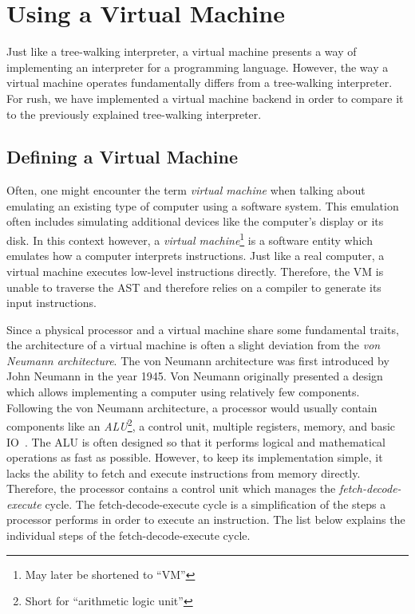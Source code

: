 \section{Using a Virtual Machine}

Just like a tree-walking interpreter, a virtual machine presents a way of implementing an interpreter for a programming language.
However, the way a virtual machine operates fundamentally differs from a tree-walking interpreter.
For rush, we have implemented a virtual machine backend in order to compare it to the previously explained tree-walking interpreter.

\subsection{Defining a Virtual Machine}

Often, one might encounter the term \emph{virtual machine} when talking about emulating an existing type of computer using a software system.
This emulation often includes simulating additional devices like the computer's display or its disk.
In this context however, a \emph{virtual machine}\footnote{May later be shortened to \enquote{VM}} is a software entity which emulates how a computer interprets instructions.
Just like a real computer, a virtual machine executes low-level instructions directly.
Therefore, the VM is unable to traverse the AST and therefore relies on a compiler to generate its input instructions.

Since a physical processor and a virtual machine share some fundamental traits,
the architecture of a virtual machine is often a slight deviation from the \emph{von Neumann architecture}.
The von Neumann architecture was first introduced by John Neumann in the year 1945.
Von Neumann originally presented a design which allows implementing a computer using relatively few components.
Following the von Neumann architecture, a processor would usually contain components like an \emph{ALU}\footnote{Short for \enquote{arithmetic logic unit}}, a control unit, multiple registers, memory, and basic IO~\cite[p.~172]{Ledin2020-yp}.
The ALU is often designed so that it performs logical and mathematical operations as fast as possible.
However, to keep its implementation simple, it lacks the ability to fetch and execute instructions from memory directly.
Therefore, the processor contains a control unit which manages the \emph{fetch-decode-execute} cycle.
The fetch-decode-execute cycle is a simplification of the steps a processor performs in order to execute an instruction.
The list below explains the individual steps of the fetch-decode-execute cycle.

